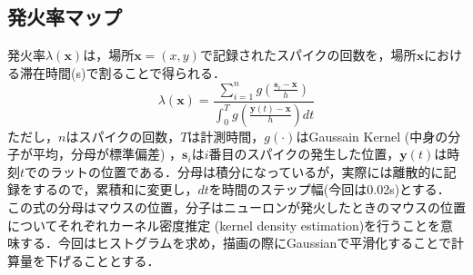 \subsection{発火率マップ}発火率$\lambda(\boldsymbol{x})$は，場所$\boldsymbol{x}=(x,y)$で記録されたスパイクの回数を，場所$\boldsymbol{x}$における滞在時間(s)で割ることで得られる． 
$$ 
\lambda(\boldsymbol{x})=\frac{\displaystyle \sum_{i=1}^n
g\left(\frac{\boldsymbol{s}_i-\boldsymbol{x}}{h}\right)}{\displaystyle \int_0^T g\left(\frac{\boldsymbol{y}(t)-\boldsymbol{x}}{h}\right)dt} 
$$ 
ただし，$n$はスパイクの回数，$T$は計測時間，$g(\cdot)$はGaussain
Kernel (中身の分子が平均，分母が標準偏差) ，$\boldsymbol{s}_i$は$i$番目のスパイクの発生した位置，$\boldsymbol{y}(t)$は時刻$t$でのラットの位置である．分母は積分になっているが，実際には離散的に記録をするので，累積和に変更し，$dt$を時間のステップ幅(今回は0.02s)とする．
この式の分母はマウスの位置，分子はニューロンが発火したときのマウスの位置についてそれぞれカーネル密度推定 (kernel density estimation)を行うことを意味する．今回はヒストグラムを求め，描画の際にGaussianで平滑化することで計算量を下げることとする．